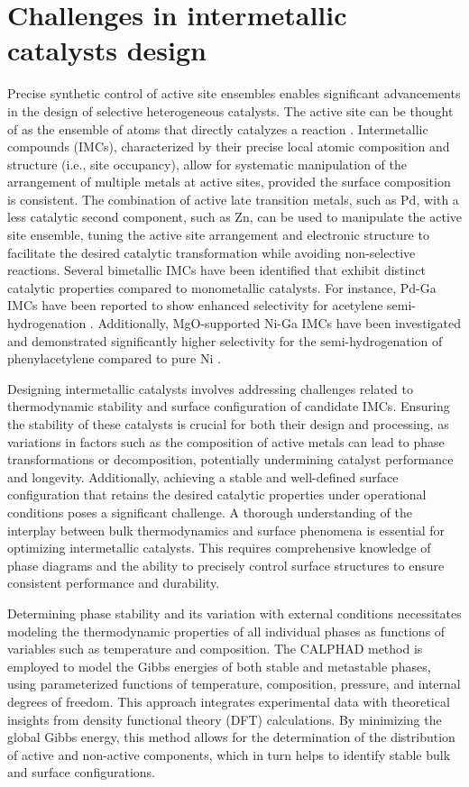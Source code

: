 \section{Challenges in intermetallic catalysts design} \label{intro:sec:catalysts}
Precise synthetic control of active site ensembles enables significant advancements in the design of selective heterogeneous catalysts. The active site can be thought of as the ensemble of atoms that directly catalyzes a reaction \cite{greeley2012active}. Intermetallic compounds (IMCs), characterized by their precise local atomic composition and structure (i.e., site occupancy), allow for systematic manipulation of the arrangement of multiple metals at active sites, provided the surface composition is consistent. The combination of active late transition metals, such as Pd, with a less catalytic second component, such as Zn, can be used to manipulate the active site ensemble, tuning the active site arrangement and electronic structure to facilitate the desired catalytic transformation while avoiding non-selective reactions. Several bimetallic IMCs have been identified that exhibit distinct catalytic properties compared to monometallic catalysts. For instance, Pd-Ga IMCs have been reported to show enhanced selectivity for acetylene semi-hydrogenation \cite{kovnir2007new, prinz2014adsorption}. Additionally, MgO-supported Ni-Ga IMCs have been investigated and demonstrated significantly higher selectivity for the semi-hydrogenation of phenylacetylene compared to pure Ni \cite{li2014nickel}.

Designing intermetallic catalysts involves addressing challenges related to thermodynamic stability and surface configuration of candidate IMCs. Ensuring the stability of these catalysts is crucial for both their design and processing, as variations in factors such as the composition of active metals can lead to phase transformations or decomposition, potentially undermining catalyst performance and longevity. Additionally, achieving a stable and well-defined surface configuration that retains the desired catalytic properties under operational conditions poses a significant challenge. A thorough understanding of the interplay between bulk thermodynamics and surface phenomena is essential for optimizing intermetallic catalysts. This requires comprehensive knowledge of phase diagrams and the ability to precisely control surface structures to ensure consistent performance and durability.

Determining phase stability and its variation with external conditions necessitates modeling the thermodynamic properties of all individual phases as functions of variables such as temperature and composition. The CALPHAD method is employed to model the Gibbs energies of both stable and metastable phases, using parameterized functions of temperature, composition, pressure, and internal degrees of freedom. This approach integrates experimental data with theoretical insights from density functional theory (DFT) calculations. By minimizing the global Gibbs energy, this method allows for the determination of the distribution of active and non-active components, which in turn helps to identify stable bulk and surface configurations.

